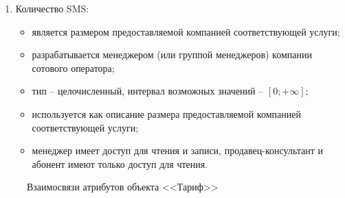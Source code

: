\begin{enumerate}
\begin{enumerate}
        \item Количество SMS:
        \begin{itemize}
            \item является размером предоставляемой компанией соответствующей услуги;
            \item разрабатывается менеджером (или группой менеджеров) компании сотового оператора;
            \item тип -- целочисленный, интервал возможных значений -- $[0; +\infty]$; %
            \item используется как описание размера предоставляемой компанией соответствующей услуги;
            \item менеджер имеет доступ для чтения и записи, продавец-консультант и абонент имеют только доступ для чтения.
        \end{itemize}
    \end{enumerate}
    \begin{figure}[H]
        \label{fig:tariff-attributes}
        \caption{Взаимосвязи атрибутов объекта <<Тариф>>}
    \end{figure}


\end{enumerate}
